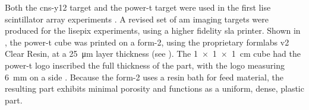 \documentclass[../../../../main.tex]{subfiles}%
\begin{document}
    Both the \gls{cns-y12} target and the \gls{power-t} target were used in the first \gls{lise} scintillator array experiments \cite{Lukosi_2016a}.
    A revised set of \gls{am} imaging targets were produced for the \gls{lisepix} experiments, using a higher fidelity \gls{sla} printer.
    Shown in , the \gls{power-t} cube was printed on a \gls{form-2}, using the proprietary \gls{formlabs} v2 Clear Resin, at a \SI{25}{\micro\meter} layer thickness (see ).
    The \SI[product-units=power]{1 x 1 x 1}{\centi\meter} cube had the \gls{power-t} logo inscribed the full thickness of the part, with the logo measuring \SI{6}{\milli\meter} on a side \cite{Herrera_2018}.
    Because the \gls{form-2} uses a resin bath for feed material, the resulting part exhibits minimal porosity and functions as a uniform, dense, plastic part.
\end{document}
